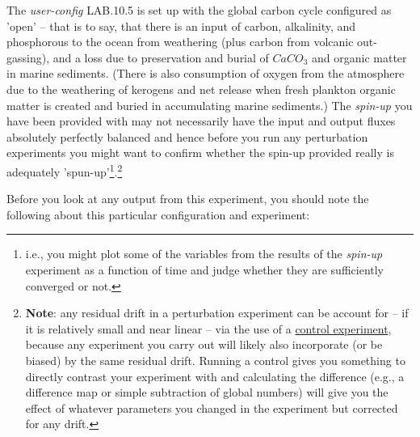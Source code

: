 The \textit{user-config} \textsf{\footnotesize LAB.10.5} is set up with the global carbon cycle configured as 'open' -- that is to say, that there is an input of carbon, alkalinity, and phosphorous to the ocean from weathering (plus carbon from volcanic out-gassing), and a loss due to preservation and burial of \(CaCO_{3}\) and organic matter in marine sediments. (There is also consumption of oxygen from the atmosphere due to the weathering of kerogens and net release when fresh plankton organic matter is created and buried in accumulating marine sediments.) The \textit{spin-up} you have been provided with may not necessarily have the input and output fluxes absolutely perfectly balanced and hence before you run any perturbation experiments you might want to confirm whether the spin-up provided really is adequately 'spun-up'\footnote{i.e., you might plot some of the variables from the results of the \textit{spin-up}  experiment as a function of time and judge whether they are sufficiently converged or not.}.\footnote{\textbf{Note}: any residual drift in a perturbation experiment can be account for -- if it is relatively small and near linear -- via the use of a \uline{control experiment}, because any experiment you carry out will likely also incorporate (or be biased) by the same residual drift. Running a control gives you something to directly contrast  your experiment with and calculating the difference (e.g., a difference map or simple subtraction of global numbers) will give you the effect of whatever parameters you changed in the experiment but corrected for any drift.} 

\newpage

\vspace{1mm}
\noindent Before you look at any output from this experiment, you should note the following about this particular configuration and experiment:

